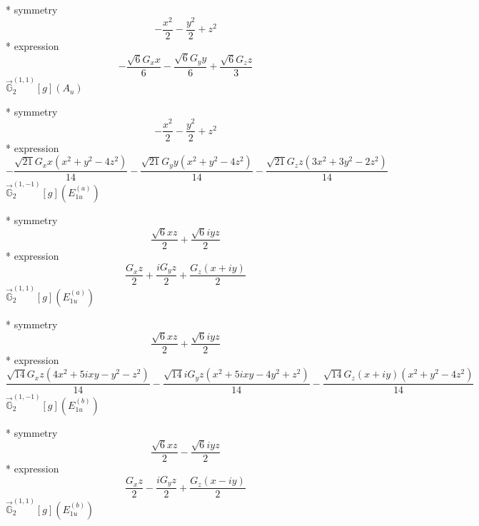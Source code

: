 \documentclass[fleqn,8pt]{jsarticle}
\begin{document}
\noindent\quad ** symmetry
\begin{dmath*}
- \frac{x^{2}}{2} - \frac{y^{2}}{2} + z^{2}
\end{dmath*}
\noindent\quad ** expression
\begin{dmath*}
- \frac{\sqrt{6} G_{x} x}{6} - \frac{\sqrt{6} G_{y} y}{6} + \frac{\sqrt{6} G_{z} z}{3}
\end{dmath*}
\noindent\quad $\vec{\mathbb{G}}_{2}^{(1,1)}[g](A_{u})$

\noindent\quad ** symmetry
\begin{dmath*}
- \frac{x^{2}}{2} - \frac{y^{2}}{2} + z^{2}
\end{dmath*}
\noindent\quad ** expression
\begin{dmath*}
- \frac{\sqrt{21} G_{x} x \left(x^{2} + y^{2} - 4 z^{2}\right)}{14} - \frac{\sqrt{21} G_{y} y \left(x^{2} + y^{2} - 4 z^{2}\right)}{14} - \frac{\sqrt{21} G_{z} z \left(3 x^{2} + 3 y^{2} - 2 z^{2}\right)}{14}
\end{dmath*}
\noindent\quad $\vec{\mathbb{G}}_{2}^{(1,-1)}[g](E_{1u}^{(a)})$

\noindent\quad ** symmetry
\begin{dmath*}
\frac{\sqrt{6} x z}{2} + \frac{\sqrt{6} i y z}{2}
\end{dmath*}
\noindent\quad ** expression
\begin{dmath*}
\frac{G_{x} z}{2} + \frac{i G_{y} z}{2} + \frac{G_{z} \left(x + i y\right)}{2}
\end{dmath*}
\noindent\quad $\vec{\mathbb{G}}_{2}^{(1,1)}[g](E_{1u}^{(a)})$

\noindent\quad ** symmetry
\begin{dmath*}
\frac{\sqrt{6} x z}{2} + \frac{\sqrt{6} i y z}{2}
\end{dmath*}
\noindent\quad ** expression
\begin{dmath*}
\frac{\sqrt{14} G_{x} z \left(4 x^{2} + 5 i x y - y^{2} - z^{2}\right)}{14} - \frac{\sqrt{14} i G_{y} z \left(x^{2} + 5 i x y - 4 y^{2} + z^{2}\right)}{14} - \frac{\sqrt{14} G_{z} \left(x + i y\right) \left(x^{2} + y^{2} - 4 z^{2}\right)}{14}
\end{dmath*}
\noindent\quad $\vec{\mathbb{G}}_{2}^{(1,-1)}[g](E_{1u}^{(b)})$

\noindent\quad ** symmetry
\begin{dmath*}
\frac{\sqrt{6} x z}{2} - \frac{\sqrt{6} i y z}{2}
\end{dmath*}
\noindent\quad ** expression
\begin{dmath*}
\frac{G_{x} z}{2} - \frac{i G_{y} z}{2} + \frac{G_{z} \left(x - i y\right)}{2}
\end{dmath*}
\noindent\quad $\vec{\mathbb{G}}_{2}^{(1,1)}[g](E_{1u}^{(b)})$
\end{document}
